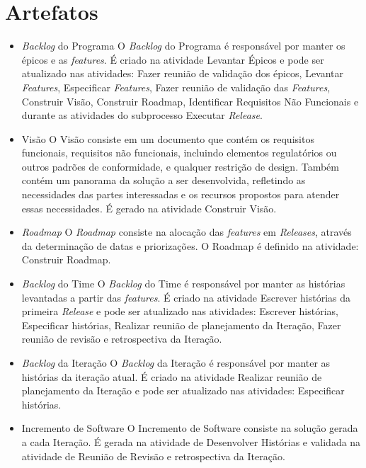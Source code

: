 \section{Artefatos}

\begin{itemize}
  \item \textit{Backlog} do Programa
    \subitem O \textit{Backlog} do Programa é responsável por manter os épicos e as \textit{features}. É criado na atividade Levantar Épicos e 
    pode ser atualizado nas atividades: Fazer reunião de validação dos épicos, Levantar \textit{Features}, Especificar \textit{Features}, 
Fazer reunião de validação das \textit{Features}, Construir Visão, Construir Roadmap, Identificar Requisitos Não Funcionais e durante as atividades
do subprocesso Executar \textit{Release}.
  
  \item Visão
   \subitem O Visão consiste em um documento que contém os requisitos funcionais, requisitos não funcionais, incluindo elementos regulatórios 
   ou outros padrões de conformidade, e qualquer restrição de design. Também contém um panorama da solução a ser desenvolvida, 
   refletindo as necessidades das partes interessadas e os recursos propostos para atender essas necessidades. É gerado na atividade Construir
   Visão.
  
  \item \textit{Roadmap}
     \subitem O \textit{Roadmap} consiste na alocação das \textit{features} em \textit{Releases}, através da determinação de datas e priorizações. O Roadmap é 
     definido na atividade: Construir Roadmap.

    
  \item \textit{Backlog} do Time
      \subitem O \textit{Backlog} do Time é responsável por manter as histórias levantadas a partir das \textit{features}. É criado na atividade Escrever 
      histórias da primeira \textit{Release} e pode ser atualizado nas atividades: Escrever histórias, Especificar histórias, Realizar reunião de planejamento 
      da Iteração, Fazer reunião de revisão e retrospectiva da Iteração.
  
  \item \textit{Backlog} da Iteração
        \subitem O \textit{Backlog} da Iteração é responsável por manter as histórias da iteração atual. É criado na atividade Realizar reunião de planejamento 
      da Iteração e pode ser atualizado nas atividades: Especificar histórias.
  
  \item Incremento de Software
      \subitem O Incremento de Software consiste na solução gerada a cada Iteração. É gerada na atividade de Desenvolver Histórias e validada na 
      atividade de Reunião de Revisão e retrospectiva da Iteração.
\end{itemize}
